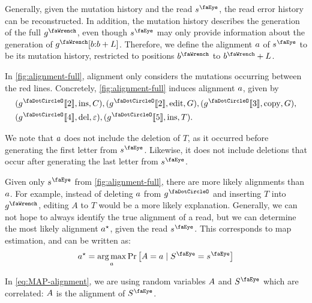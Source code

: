 Generally, given the mutation history and the read $\segment^\gread$, the read error history can be reconstructed.
In addition, the mutation history describes the generation of the full $\genome^\gmut$, even though $\segment^\gread$ may only provide information about the generation of $\genome^\gmut[\startInGenome \shortcolon \startInGenome + L]$. 
Therefore, we define the alignment $a$ of $\segment^\gread$ to be its mutation history, restricted to positions $\startInGenome^\gmut$ to $\startInGenome^\gmut + L$.

In \cref{fig:alignment-full}, alignment only considers the mutations occurring
between the red lines. Concretely, \cref{fig:alignment-full} induces alignment
$a$, given by 
\begin{align*}
&(\genome^\gcore\llbracket 2 \rrbracket,\text{ins},C),(\genome^\gcore\llbracket 2 \rrbracket,\text{edit},G), (\genome^\gcore\llbracket 3 \rrbracket,\text{copy},G),\\
&(\genome^\gcore\llbracket 4 \rrbracket,\text{del},\epsilon),(\genome^\gcore\llbracket 5 \rrbracket,\text{ins},T).
\end{align*}

We note that $a$ does not include the deletion of $T$, as it occurred before generating the first letter from $\segment^\gread$.
Likewise, it does not include deletions that occur after generating the last letter from $\segment^\gread$.


Given only $\segment^\gread$ from \cref{fig:alignment-full}, there are more likely alignments than $a$.
For example, instead of deleting $a$ from $\genome^\gcore$ and inserting $T$ into $\genome^\gmut$, editing $A$ to $T$ would be a more likely explanation.
Generally, we can not hope to always identify the true alignment of a read, but we can determine the most likely alignment $a^\star$, given the read $\segment^\gread$. This corresponds to \acf{map} estimation, and can be written as:
\begin{align} \label{eq:MAP-alignment}
	\alignment^\star = \argmax_{\alignment} \Pr{\alignmentRV=\alignment \mid \segmentRV^\gread = \segment^\gread}
\end{align}

In \cref{eq:MAP-alignment}, we are using random variables $A$ and $\segmentRV^\gread$ which are correlated: $A$ is the alignment of $\segmentRV^\gread$.

